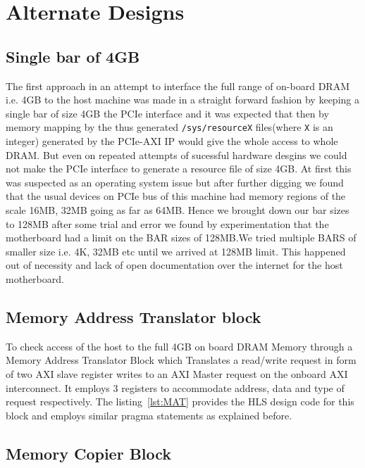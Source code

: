 \chapter{Alternate Designs}

\section{Single bar of 4GB}

The first approach in an attempt to interface the full range of on-board DRAM i.e. 4GB to the host machine was made in a straight forward
fashion by keeping a single bar of size 4GB the PCIe interface and it was expected that then by memory mapping by the thus generated
\verb|/sys/resourceX| files(where \verb|X| is an integer) generated by the PCIe-AXI IP would give the whole access to whole DRAM. But even
on repeated attempts of sucessful hardware desgins we could not make the PCIe interface to generate a resource file of size 4GB. At first
this was suspected as an operating system issue but after further digging we found that the usual devices on PCIe bus of this machine had
memory regions of the scale 16MB, 32MB going as far as 64MB. Hence we brought down our bar sizes to 128MB after some trial and error we
found by experimentation that the motherboard had a limit on the BAR sizes of 128MB.We tried multiple BARS of smaller size i.e. 4K, 32MB etc
until we arrived at 128MB limit. This happened out of necessity and lack of open documentation over the internet for the host motherboard.

\pagebreak

\section{Memory Address Translator block} \label{MAT block}

To check access of the host to the full 4GB on board DRAM Memory through a Memory Address Translator Block which Translates a read/write
request in form of two AXI slave register writes to an AXI Master request on the onboard AXI interconnect. It employs 3 registers to
accommodate address, data and type of request respectively. The listing~\ref{lst:MAT} provides the HLS design code for this block and
employs similar pragma statements as explained before.



\section{Memory Copier Block}

